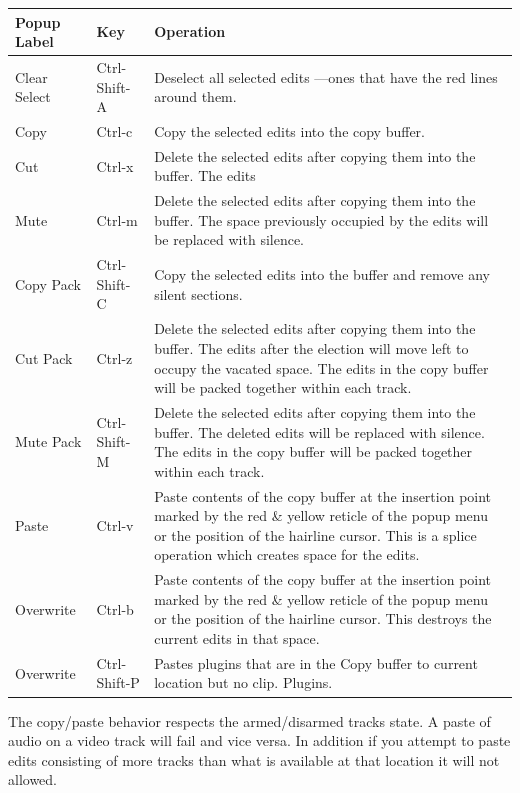 \begin{center}
    \begin{longtable}{l l p{11cm}}
        \toprule
        \textbf{Popup Label} & \textbf{Key} & \textbf{Operation} \\ \midrule
        \endhead
        Clear Select & Ctrl-Shift-A & Deselect all selected edits ---ones that have the red lines around them. \\
        Copy & Ctrl-c & Copy the selected edits into the copy buffer. \\
        Cut & Ctrl-x & Delete the selected edits after copying them into the buffer.  The edits \\
        Mute & Ctrl-m & Delete the selected edits after copying them into the buffer.  The space
        previously occupied by the edits will be replaced with silence.\\
        Copy Pack & Ctrl-Shift-C & Copy the selected edits into the buffer and remove any silent sections.\\
        Cut Pack &	Ctrl-z	&	Delete the selected edits after copying them into the buffer.  The edits after the election will move left to occupy the vacated space.  The edits in the copy buffer will be packed together within each track. \\
        Mute Pack &	Ctrl-Shift-M &	Delete the selected edits after copying them into the buffer.  The deleted
        edits will be replaced with silence.  The edits in the copy buffer will be packed together within each track. \\
        Paste 	&	Ctrl-v	&	Paste contents of the copy buffer at the insertion point marked by the red \& yellow reticle of the popup menu or the position of the hairline cursor.
        This is a splice operation which creates space for the edits. \\
        Overwrite &	Ctrl-b	&	Paste contents of the copy buffer at the insertion point marked by the red \& yellow reticle of the popup menu or the position of the hairline cursor.
        This destroys the current edits in that space. \\
        Overwrite &	Ctrl-Shift-P &	Pastes plugins that are in the Copy buffer to current location but no clip.
        Plugins. \\ \bottomrule
    \end{longtable}
\end{center}
The copy/paste behavior respects the armed/disarmed tracks state.  A paste of audio on a video track will fail and vice versa.  In addition if you attempt to paste edits consisting of more tracks than what is available at that location it will not allowed.

